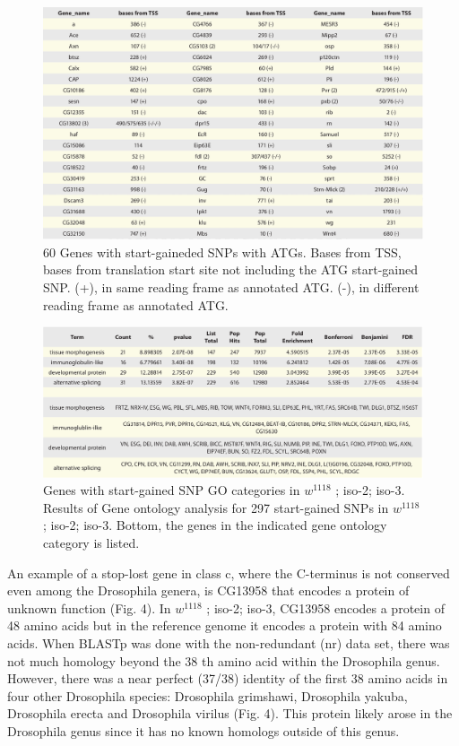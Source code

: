 \begin{figure}
    \centering
    \includegraphics[width=14cm]{snpeff_table5.png}
    \caption{60 Genes with start-gaineded SNPs with ATGs. Bases from TSS, bases from translation start site not including the ATG start-gained SNP. (+), in same reading frame as annotated ATG. (-), in different reading frame as annotated ATG.}
    \label{fig:snpeffTab3}
\end{figure}

\begin{figure}
    \centering
    \includegraphics[width=14cm]{snpeff_table6.png}
    \caption{Genes with start-gained SNP GO categories in $w^{1118}$ ; iso-2; iso-3. Results of Gene ontology analysis for 297 start-gained SNPs in $w^{1118}$ ; iso-2; iso-3. Bottom, the genes in the indicated gene ontology category is listed.}
    \label{fig:snpeffTab3}
\end{figure}

An example of a stop-lost gene in class c, where the C-terminus is not conserved even among the Drosophila genera, is CG13958 that encodes a protein of unknown function (Fig. 4). In $w^{1118}$ ; iso-2; iso-3, CG13958 encodes a protein of 48 amino acids but in the reference genome it encodes a protein with 84 amino acids.  When BLASTp was done with the non-redundant (nr) data set, there was not much homology beyond the 38 th amino acid within the Drosophila genus. However, there was a near perfect (37/38) identity of the first 38 amino acids in four other Drosophila species: Drosophila grimshawi, Drosophila yakuba, Drosophila erecta and Drosophila virilus (Fig. 4). This protein likely arose in the Drosophila genus since it has no known homologs outside of this genus.

